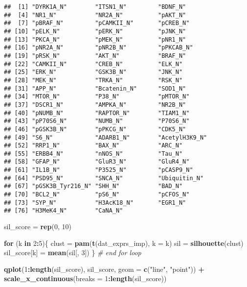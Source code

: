 \documentclass[]{article}
\newenvironment{Shaded}{\begin{snugshade}}{\end{snugshade}}
\newcommand{\KeywordTok}[1]{\textcolor[rgb]{0.13,0.29,0.53}{\textbf{#1}}}
\newcommand{\DataTypeTok}[1]{\textcolor[rgb]{0.13,0.29,0.53}{#1}}
\newcommand{\DecValTok}[1]{\textcolor[rgb]{0.00,0.00,0.81}{#1}}
\newcommand{\StringTok}[1]{\textcolor[rgb]{0.31,0.60,0.02}{#1}}
\newcommand{\CommentTok}[1]{\textcolor[rgb]{0.56,0.35,0.01}{\textit{#1}}}
\newcommand{\ControlFlowTok}[1]{\textcolor[rgb]{0.13,0.29,0.53}{\textbf{#1}}}
\newcommand{\OperatorTok}[1]{\textcolor[rgb]{0.81,0.36,0.00}{\textbf{#1}}}
\newcommand{\NormalTok}[1]{#1}
\begin{document}
\begin{verbatim}
##  [1] "DYRK1A_N"        "ITSN1_N"         "BDNF_N"         
##  [4] "NR1_N"           "NR2A_N"          "pAKT_N"         
##  [7] "pBRAF_N"         "pCAMKII_N"       "pCREB_N"        
## [10] "pELK_N"          "pERK_N"          "pJNK_N"         
## [13] "PKCA_N"          "pMEK_N"          "pNR1_N"         
## [16] "pNR2A_N"         "pNR2B_N"         "pPKCAB_N"       
## [19] "pRSK_N"          "AKT_N"           "BRAF_N"         
## [22] "CAMKII_N"        "CREB_N"          "ELK_N"          
## [25] "ERK_N"           "GSK3B_N"         "JNK_N"          
## [28] "MEK_N"           "TRKA_N"          "RSK_N"          
## [31] "APP_N"           "Bcatenin_N"      "SOD1_N"         
## [34] "MTOR_N"          "P38_N"           "pMTOR_N"        
## [37] "DSCR1_N"         "AMPKA_N"         "NR2B_N"         
## [40] "pNUMB_N"         "RAPTOR_N"        "TIAM1_N"        
## [43] "pP70S6_N"        "NUMB_N"          "P70S6_N"        
## [46] "pGSK3B_N"        "pPKCG_N"         "CDK5_N"         
## [49] "S6_N"            "ADARB1_N"        "AcetylH3K9_N"   
## [52] "RRP1_N"          "BAX_N"           "ARC_N"          
## [55] "ERBB4_N"         "nNOS_N"          "Tau_N"          
## [58] "GFAP_N"          "GluR3_N"         "GluR4_N"        
## [61] "IL1B_N"          "P3525_N"         "pCASP9_N"       
## [64] "PSD95_N"         "SNCA_N"          "Ubiquitin_N"    
## [67] "pGSK3B_Tyr216_N" "SHH_N"           "BAD_N"          
## [70] "BCL2_N"          "pS6_N"           "pCFOS_N"        
## [73] "SYP_N"           "H3AcK18_N"       "EGR1_N"         
## [76] "H3MeK4_N"        "CaNA_N"
\end{verbatim}

\begin{Shaded}
\begin{Highlighting}[]
\NormalTok{sil_score =}\StringTok{ }\KeywordTok{rep}\NormalTok{(}\DecValTok{0}\NormalTok{, }\DecValTok{10}\NormalTok{)}

\ControlFlowTok{for}\NormalTok{ (k }\ControlFlowTok{in} \DecValTok{2}\OperatorTok{:}\DecValTok{5}\NormalTok{)\{}
\NormalTok{    clust =}\StringTok{ }\KeywordTok{pam}\NormalTok{(}\KeywordTok{t}\NormalTok{(dat_exprs_imp), }\DataTypeTok{k =}\NormalTok{ k)}
\NormalTok{    sil   =}\StringTok{ }\KeywordTok{silhouette}\NormalTok{(clust)}
\NormalTok{    sil_score[k] =}\StringTok{ }\KeywordTok{mean}\NormalTok{(sil[, }\DecValTok{3}\NormalTok{])    }
\NormalTok{\} }\CommentTok{# end for loop}

\KeywordTok{qplot}\NormalTok{(}\DecValTok{1}\OperatorTok{:}\KeywordTok{length}\NormalTok{(sil_score), sil_score, }\DataTypeTok{geom =} \KeywordTok{c}\NormalTok{(}\StringTok{"line"}\NormalTok{, }\StringTok{"point"}\NormalTok{)) }\OperatorTok{+}
\StringTok{    }\KeywordTok{scale_x_continuous}\NormalTok{(}\DataTypeTok{breaks =} \DecValTok{1}\OperatorTok{:}\KeywordTok{length}\NormalTok{(sil_score))}
\end{Highlighting}
\end{Shaded}
\end{document}
